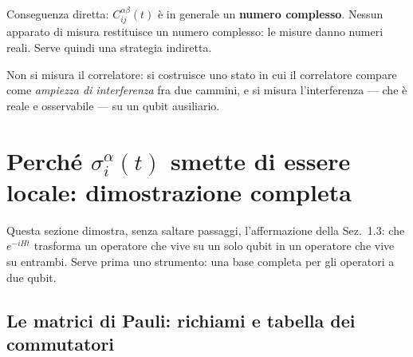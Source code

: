 \documentclass[11pt,a4paper]{article}
\begin{document}
Conseguenza diretta: $C_{ij}^{\alpha\beta}(t)$ è in generale un \textbf{numero complesso}. Nessun
apparato di misura restituisce un numero complesso: le misure danno numeri reali. Serve quindi
una strategia indiretta.

\begin{ideabox}
Non si misura il correlatore: si costruisce uno stato in cui il correlatore compare come
\emph{ampiezza di interferenza} fra due cammini, e si misura l'interferenza --- che è reale e
osservabile --- su un qubit ausiliario.
\end{ideabox}

\section{Perché \texorpdfstring{$\sigma_i^\alpha(t)$}{sigma(t)} smette di essere locale: dimostrazione completa}
\label{sec:spalmamento}

Questa sezione dimostra, senza saltare passaggi, l'affermazione della Sez.~1.3: che
$e^{-iHt}$ trasforma un operatore che vive su un solo qubit in un operatore che vive su
entrambi. Serve prima uno strumento: una base completa per gli operatori a due qubit.

\subsection{Le matrici di Pauli: richiami e tabella dei commutatori}
\end{document}

